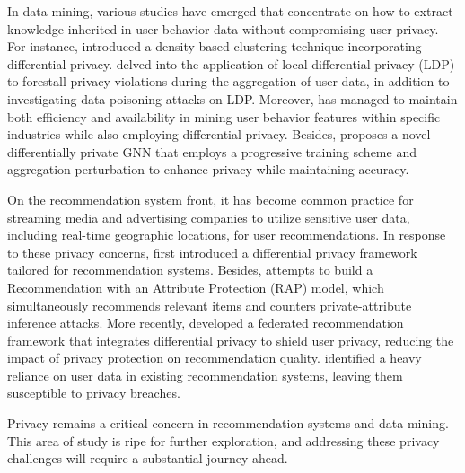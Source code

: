 In data mining, various studies have emerged that concentrate on how to extract knowledge inherited in user behavior data without compromising user privacy. For instance, \cite{wdz24} introduced a density-based clustering technique incorporating differential privacy. \cite{tcnz24} delved into the application of local differential privacy (LDP) to forestall privacy violations during the aggregation of user data, in addition to investigating data poisoning attacks on LDP. 
Moreover, \cite{lzly23} has managed to maintain both efficiency and availability in mining user behavior features within specific industries while also employing differential privacy. Besides, \cite{sg24} proposes a novel differentially private GNN that employs a progressive training scheme and aggregation perturbation to enhance privacy while maintaining accuracy. 

On the recommendation system front, it has become common practice for streaming media and advertising companies to utilize sensitive user data, including real-time geographic locations, for user recommendations.
In response to these privacy concerns, \cite{mm09} first introduced a differential privacy framework tailored for recommendation systems. 
Besides, \cite{bmga+20} attempts to build a Recommendation with an Attribute Protection (RAP) model, which simultaneously recommends relevant items and counters private-attribute inference attacks.
More recently, \cite{xcs24} developed a federated recommendation framework that integrates differential privacy to shield user privacy, reducing the impact of privacy protection on recommendation quality. 
\cite{hh23} identified a heavy reliance on user data in existing recommendation systems, leaving them susceptible to privacy breaches. 

Privacy remains a critical concern in recommendation systems and data mining. This area of study is ripe for further exploration, and addressing these privacy challenges will require a substantial journey ahead.







